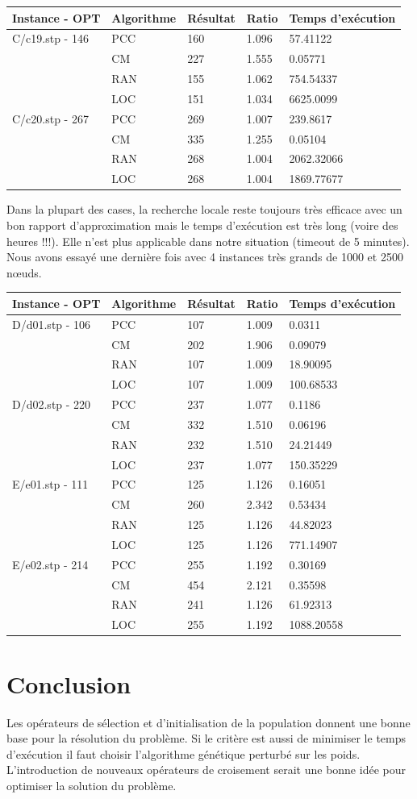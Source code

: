 \documentclass[12pt,a4paper]{article}
\begin{document}
\begin{center}
	\begin{tabular}{l|l|l|l|l}
		Instance - OPT & Algorithme & Résultat & Ratio & Temps d'exécution\\ \hline \hline
		C/c19.stp - 146&PCC&160&1.096&57.41122\\
		&CM&227&1.555&0.05771\\
		&RAN&155&1.062&754.54337\\
		&LOC&151&1.034&6625.0099\\\hline
		C/c20.stp - 267&PCC&269&1.007&239.8617\\
		&CM&335&1.255&0.05104\\
		&RAN&268&1.004&2062.32066\\
		&LOC&268&1.004&1869.77677\\\hline
	\end{tabular}
\end{center}		
Dans la plupart des cases, la recherche locale reste toujours très efficace avec un bon rapport d'approximation mais le temps d'exécution est très long (voire des heures !!!). Elle n'est plus applicable dans notre situation (timeout de 5 minutes).\\
Nous avons essayé une dernière fois avec 4 instances très grands de 1000 et 2500 nœuds.
\begin{center}
	\begin{tabular}{l|l|l|l|l}
		Instance - OPT & Algorithme & Résultat & Ratio & Temps d'exécution\\ \hline \hline
		D/d01.stp - 106&PCC&107&1.009&0.0311\\
		&CM&202&1.906&0.09079\\
		&RAN&107&1.009&18.90095\\
		&LOC&107&1.009&100.68533\\\hline
		D/d02.stp - 220&PCC&237&1.077&0.1186\\
		&CM&332&1.510&0.06196\\
		&RAN&232&1.510&24.21449\\
		&LOC&237&1.077&150.35229\\\hline
		E/e01.stp - 111&PCC&125&1.126&0.16051\\
		&CM&260&2.342&0.53434\\
		&RAN&125&1.126&44.82023\\
		&LOC&125&1.126&771.14907\\\hline
		E/e02.stp - 214&PCC&255&1.192&0.30169\\
		&CM&454&2.121&0.35598\\
		&RAN&241&1.126&61.92313\\
		&LOC&255&1.192&1088.20558\\\hline
	\end{tabular}
\end{center}
\section{Conclusion}
Les opérateurs de sélection et d'initialisation de la population donnent une bonne base pour la résolution du problème. Si le critère est aussi de minimiser le temps d'exécution il faut choisir l'algorithme génétique perturbé sur les poids. L'introduction de nouveaux opérateurs de croisement serait une bonne idée pour optimiser la solution du problème.
\end{document}
